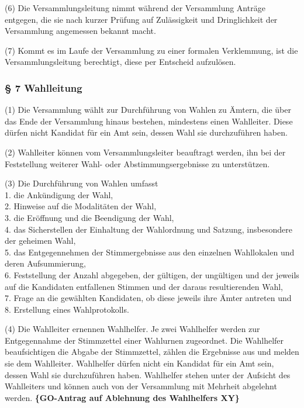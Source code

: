 (6) Die Versammlungsleitung nimmt während der Versammlung Anträge
entgegen, die sie nach kurzer Prüfung auf Zulässigkeit und Dringlichkeit
der Versammlung angemessen bekannt macht.

(7) Kommt es im Laufe der Versammlung zu einer formalen Verklemmung, ist
die Versammlungsleitung berechtigt, diese per Entscheid aufzulösen.

\subsubsection{§ 7 Wahlleitung}

(1) Die Versammlung wählt zur Durchführung von Wahlen zu Ämtern, die
über das Ende der Versammlung hinaus bestehen, mindestens einen
Wahlleiter. Diese dürfen nicht Kandidat für ein Amt sein, dessen Wahl
sie durchzuführen haben.

(2) Wahlleiter können vom Versammlungsleiter beauftragt werden, ihn bei
der Feststellung weiterer Wahl- oder Abstimmungsergebnisse zu
unterstützen.

(3) Die Durchführung von Wahlen umfasst \\ 1. die Ankündigung der Wahl,
\\ 2. Hinweise auf die Modalitäten der Wahl, \\ 3. die Eröffnung und die
Beendigung der Wahl, \\ 4. das Sicherstellen der Einhaltung der
Wahlordnung und Satzung, insbesondere der geheimen Wahl, \\ 5. das
Entgegennehmen der Stimmergebnisse aus den einzelnen Wahllokalen und
deren Aufsummierung, \\ 6. Feststellung der Anzahl abgegeben, der
gültigen, der ungültigen und der jeweils auf die Kandidaten entfallenen
Stimmen und der daraus resultierenden Wahl, \\ 7. Frage an die gewählten
Kandidaten, ob diese jeweils ihre Ämter antreten und \\ 8. Erstellung
eines Wahlprotokolls.

(4) Die Wahlleiter ernennen Wahlhelfer. Je zwei Wahlhelfer werden zur
Entgegennahme der Stimmzettel einer Wahlurnen zugeordnet. Die Wahlhelfer
beaufsichtigen die Abgabe der Stimmzettel, zählen die Ergebnisse aus und
melden sie dem Wahlleiter. Wahlhelfer dürfen nicht ein Kandidat für ein
Amt sein, dessen Wahl sie durchzuführen haben. Wahlhelfer stehen unter
der Aufsicht des Wahlleiters und können auch von der Versammlung mit
Mehrheit abgelehnt werden. \textbf{\{GO-Antrag auf Ablehnung des
Wahlhelfers XY\}}

